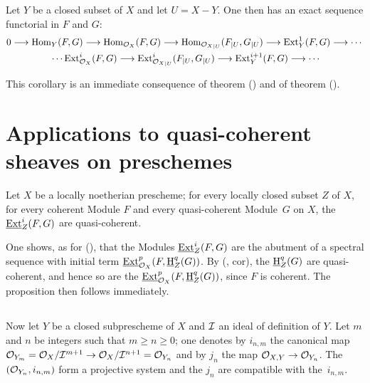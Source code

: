 \begin{corollary} \label{VI.1.9} Let $Y$ be a closed subset of $X$ and let $U=X{-} Y$. One then has an exact sequence functorial in $F$ and $G$:
\begin{gather*}
0 \to \Hom_Y(F, G) \to \Hom_{\OX}(F, G) \to \Hom_{{\OX}_{|U}}(F_{|U}, G_{|U}) \to \Ext_{Y}^1(F, G) \to \cdots{}\\
{}\cdots \Ext_{{\OX}}^i(F, G) \to \Ext_{{{\OX}_{|U}}}^i(F_{|U}, G_{|U}) \to \Ext_{Y}^{i+1}(F, G) \to \cdots
\end{gather*}
\end{corollary}

This corollary is an immediate consequence of theorem () and of theorem ().

\section{Applications to quasi-coherent sheaves on preschemes} \label{VI.2}

\begin{proposition} \label{VI.2.1}
Let $X$ be a locally noetherian prescheme; for every locally closed subset $Z$ of $X$, for every coherent Module $F$ and every quasi-coherent Module~$G$ on $X$, the $\operatorname{\underline{Ext}}_Z^i(F, G)$ are quasi-coherent.
\end{proposition}

One shows, as for (), that the Modules $\operatorname{\underline{Ext}}_Z^i(F, G)$ are the abutment of a spectral sequence with initial term $\operatorname{\underline{Ext}}_{\mathcal{O}_X}^p(F, \operatorname{\underline{H}}_Z^q (G))$. By (, cor\ptbl {}), the $\operatorname{\underline{H}}_Z^q(G)$ are quasi-coherent, and hence so are the $\operatorname{\underline{Ext}}_{\mathcal{O}_X}^p (F, \operatorname{\underline{H}}_Z^q (G))$, since $F$ is coherent. The proposition then follows immediately.

\begin{empty} \label{VI.2.2}
\end{empty}

\subsection{} Now let $Y$ be a closed subprescheme of $X$ and $\mathcal{I}$ an ideal of definition of $Y$. Let $m$ and $n$ be integers such that $m\geq n \geq 0$; one denotes by $i_{n, m}$ the canonical map $\Oo_{Y_m} = \OX/\SheafI^{m+1} \to \OX/\SheafI^{n+1} = \Oo_{Y_n}$ and by $j_n$ the map \hbox{$\Oo_{X, Y}\to \Oo_{Y_n}$}. The $({\mathcal O}_{Y_n}, i_{n, m})$ form a projective system and the $j_n$ are compatible with the~$i_{n, m}$.

